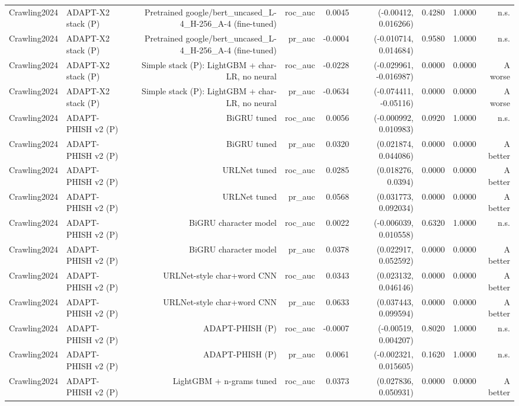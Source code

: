 \begin{table}[t]
\begin{tabular}{llrrrrrrr}
Crawling2024 & ADAPT-X2 stack (P) & Pretrained google/bert\_uncased\_L-4\_H-256\_A-4 (fine-tuned) & roc\_auc & 0.0045 & (-0.00412, 0.016266) & 0.4280 & 1.0000 & n.s. \\
Crawling2024 & ADAPT-X2 stack (P) & Pretrained google/bert\_uncased\_L-4\_H-256\_A-4 (fine-tuned) & pr\_auc & -0.0004 & (-0.010714, 0.014684) & 0.9580 & 1.0000 & n.s. \\
Crawling2024 & ADAPT-X2 stack (P) & Simple stack (P): LightGBM + char-LR, no neural & roc\_auc & -0.0228 & (-0.029961, -0.016987) & 0.0000 & 0.0000 & A worse \\
Crawling2024 & ADAPT-X2 stack (P) & Simple stack (P): LightGBM + char-LR, no neural & pr\_auc & -0.0634 & (-0.074411, -0.05116) & 0.0000 & 0.0000 & A worse \\
Crawling2024 & ADAPT-PHISH v2 (P) & BiGRU tuned & roc\_auc & 0.0056 & (-0.000992, 0.010983) & 0.0920 & 1.0000 & n.s. \\
Crawling2024 & ADAPT-PHISH v2 (P) & BiGRU tuned & pr\_auc & 0.0320 & (0.021874, 0.044086) & 0.0000 & 0.0000 & A better \\
Crawling2024 & ADAPT-PHISH v2 (P) & URLNet tuned & roc\_auc & 0.0285 & (0.018276, 0.0394) & 0.0000 & 0.0000 & A better \\
Crawling2024 & ADAPT-PHISH v2 (P) & URLNet tuned & pr\_auc & 0.0568 & (0.031773, 0.092034) & 0.0000 & 0.0000 & A better \\
Crawling2024 & ADAPT-PHISH v2 (P) & BiGRU character model & roc\_auc & 0.0022 & (-0.006039, 0.010558) & 0.6320 & 1.0000 & n.s. \\
Crawling2024 & ADAPT-PHISH v2 (P) & BiGRU character model & pr\_auc & 0.0378 & (0.022917, 0.052592) & 0.0000 & 0.0000 & A better \\
Crawling2024 & ADAPT-PHISH v2 (P) & URLNet-style char+word CNN & roc\_auc & 0.0343 & (0.023132, 0.046146) & 0.0000 & 0.0000 & A better \\
Crawling2024 & ADAPT-PHISH v2 (P) & URLNet-style char+word CNN & pr\_auc & 0.0633 & (0.037443, 0.099594) & 0.0000 & 0.0000 & A better \\
Crawling2024 & ADAPT-PHISH v2 (P) & ADAPT-PHISH (P) & roc\_auc & -0.0007 & (-0.00519, 0.004207) & 0.8020 & 1.0000 & n.s. \\
Crawling2024 & ADAPT-PHISH v2 (P) & ADAPT-PHISH (P) & pr\_auc & 0.0061 & (-0.002321, 0.015605) & 0.1620 & 1.0000 & n.s. \\
Crawling2024 & ADAPT-PHISH v2 (P) & LightGBM + n-grams tuned & roc\_auc & 0.0373 & (0.027836, 0.050931) & 0.0000 & 0.0000 & A better \\

\end{tabular}
\end{table}
